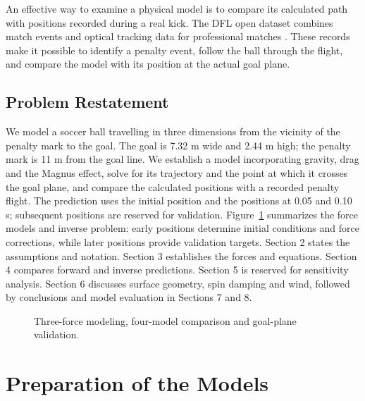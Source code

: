 \documentclass[12pt,letterpaper]{article}
\begin{document}
An effective way to examine a physical model is to compare its calculated path with positions recorded during a real kick. The DFL open dataset combines match events and optical tracking data for professional matches \cite{bassek,dataset}. These records make it possible to identify a penalty event, follow the ball through the flight, and compare the model with its position at the actual goal plane.

\subsection{Problem Restatement}
We model a soccer ball travelling in three dimensions from the vicinity of the penalty mark to the goal. The goal is 7.32 m wide and 2.44 m high; the penalty mark is 11 m from the goal line. We establish a model incorporating gravity, drag and the Magnus effect, solve for its trajectory and the point at which it crosses the goal plane, and compare the calculated positions with a recorded penalty flight. The prediction uses the initial position and the positions at 0.05 and 0.10 s; subsequent positions are reserved for validation. Figure~\ref{fig:workflow} summarizes the force models and inverse problem: early positions determine initial conditions and force corrections, while later positions provide validation targets. Section 2 states the assumptions and notation. Section 3 establishes the forces and equations. Section 4 compares forward and inverse predictions. Section 5 is reserved for sensitivity analysis. Section 6 discusses surface geometry, spin damping and wind, followed by conclusions and model evaluation in Sections 7 and 8.
\begin{figure}[H]\centering
\resizebox{\textwidth}{!}{}
\caption{Three-force modeling, four-model comparison and goal-plane validation.}\label{fig:workflow}
\end{figure}


\section{Preparation of the Models}
\end{document}
